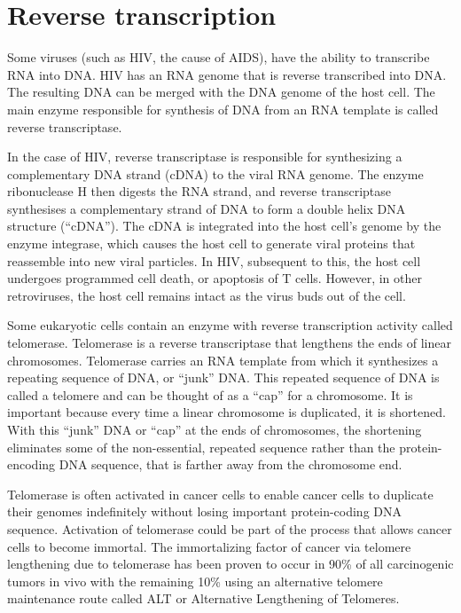 \hypertarget{reverse-transcription}{%
\section{Reverse transcription}\label{reverse-transcription}}

Some viruses (such as HIV, the cause of AIDS), have the ability to transcribe RNA into DNA. HIV has an RNA genome that is reverse transcribed into DNA. The resulting DNA can be merged with the DNA genome of the host cell. The main enzyme responsible for synthesis of DNA from an RNA template is called reverse transcriptase.

In the case of HIV, reverse transcriptase is responsible for synthesizing a complementary DNA strand (cDNA) to the viral RNA genome. The enzyme ribonuclease H then digests the RNA strand, and reverse transcriptase synthesises a complementary strand of DNA to form a double helix DNA structure (``cDNA''). The cDNA is integrated into the host cell's genome by the enzyme integrase, which causes the host cell to generate viral proteins that reassemble into new viral particles. In HIV, subsequent to this, the host cell undergoes programmed cell death, or apoptosis of T cells. However, in other retroviruses, the host cell remains intact as the virus buds out of the cell.

Some eukaryotic cells contain an enzyme with reverse transcription activity called telomerase. Telomerase is a reverse transcriptase that lengthens the ends of linear chromosomes. Telomerase carries an RNA template from which it synthesizes a repeating sequence of DNA, or ``junk'' DNA. This repeated sequence of DNA is called a telomere and can be thought of as a ``cap'' for a chromosome. It is important because every time a linear chromosome is duplicated, it is shortened. With this ``junk'' DNA or ``cap'' at the ends of chromosomes, the shortening eliminates some of the non-essential, repeated sequence rather than the protein-encoding DNA sequence, that is farther away from the chromosome end.

Telomerase is often activated in cancer cells to enable cancer cells to duplicate their genomes indefinitely without losing important protein-coding DNA sequence. Activation of telomerase could be part of the process that allows cancer cells to become immortal. The immortalizing factor of cancer via telomere lengthening due to telomerase has been proven to occur in 90\% of all carcinogenic tumors in vivo with the remaining 10\% using an alternative telomere maintenance route called ALT or Alternative Lengthening of Telomeres.

